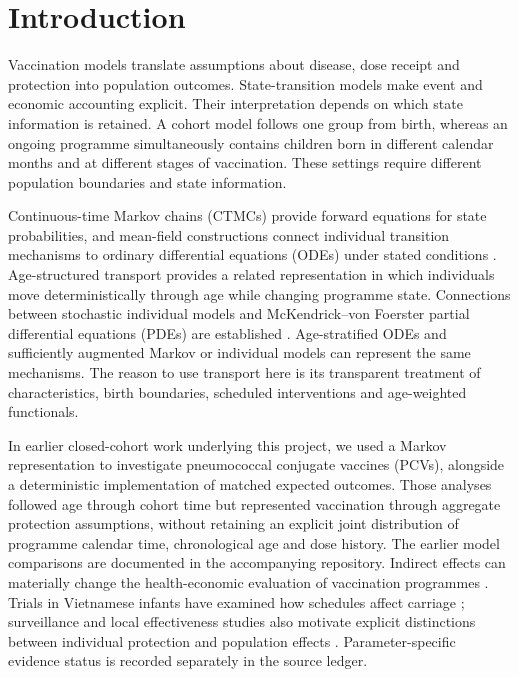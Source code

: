 \documentclass[10pt,letterpaper]{article}
\begin{document}
\section{Introduction}
Vaccination models translate assumptions about disease, dose receipt and protection into population outcomes. State-transition models make event and economic accounting explicit. Their interpretation depends on which state information is retained. A cohort model follows one group from birth, whereas an ongoing programme simultaneously contains children born in different calendar months and at different stages of vaccination. These settings require different population boundaries and state information.

Continuous-time Markov chains (CTMCs) provide forward equations for state probabilities, and mean-field constructions connect individual transition mechanisms to ordinary differential equations (ODEs) under stated conditions \cite{Hurtado2021}. Age-structured transport provides a related representation in which individuals move deterministically through age while changing programme state. Connections between stochastic individual models and McKendrick--von Foerster partial differential equations (PDEs) are established \cite{Foutel2022}. Age-stratified ODEs and sufficiently augmented Markov or individual models can represent the same mechanisms. The reason to use transport here is its transparent treatment of characteristics, birth boundaries, scheduled interventions and age-weighted functionals.

In earlier closed-cohort work underlying this project, we used a Markov representation to investigate pneumococcal conjugate vaccines (PCVs), alongside a deterministic implementation of matched expected outcomes. Those analyses followed age through cohort time but represented vaccination through aggregate protection assumptions, without retaining an explicit joint distribution of programme calendar time, chronological age and dose history. The earlier model comparisons are documented in the accompanying repository. Indirect effects can materially change the health-economic evaluation of vaccination programmes \cite{Brisson2003Herd,Jit2011Primer}. Trials in Vietnamese infants have examined how schedules affect carriage \cite{SmithVaughan2023VietnamCarriage}; surveillance and local effectiveness studies also motivate explicit distinctions between individual protection and population effects \cite{Bennett2025,Truong2026VietnamEffectiveness}. Parameter-specific evidence status is recorded separately in the source ledger.
\end{document}

